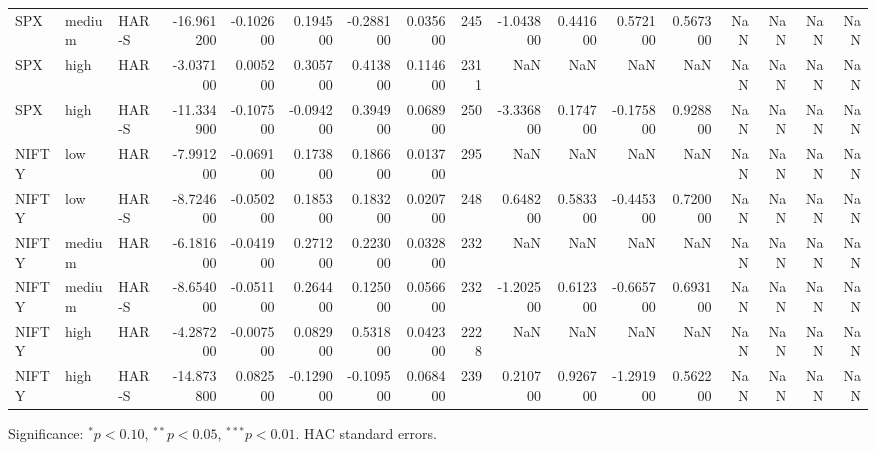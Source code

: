 \begin{table}[htbp]
{\begin{tabular}{lllrrrrrrrrrrrrrr}
SPX & medium & HAR-S & -16.961200 & -0.102600 & 0.194500 & -0.288100 & 0.035600 & 245 & -1.043800 & 0.441600 & 0.572100 & 0.567300 & NaN & NaN & NaN & NaN \\
SPX & high & HAR & -3.037100 & 0.005200 & 0.305700 & 0.413800 & 0.114600 & 2311 & NaN & NaN & NaN & NaN & NaN & NaN & NaN & NaN \\
SPX & high & HAR-S & -11.334900 & -0.107500 & -0.094200 & 0.394900 & 0.068900 & 250 & -3.336800 & 0.174700 & -0.175800 & 0.928800 & NaN & NaN & NaN & NaN \\
NIFTY & low & HAR & -7.991200 & -0.069100 & 0.173800 & 0.186600 & 0.013700 & 295 & NaN & NaN & NaN & NaN & NaN & NaN & NaN & NaN \\
NIFTY & low & HAR-S & -8.724600 & -0.050200 & 0.185300 & 0.183200 & 0.020700 & 248 & 0.648200 & 0.583300 & -0.445300 & 0.720000 & NaN & NaN & NaN & NaN \\
NIFTY & medium & HAR & -6.181600 & -0.041900 & 0.271200 & 0.223000 & 0.032800 & 232 & NaN & NaN & NaN & NaN & NaN & NaN & NaN & NaN \\
NIFTY & medium & HAR-S & -8.654000 & -0.051100 & 0.264400 & 0.125000 & 0.056600 & 232 & -1.202500 & 0.612300 & -0.665700 & 0.693100 & NaN & NaN & NaN & NaN \\
NIFTY & high & HAR & -4.287200 & -0.007500 & 0.082900 & 0.531800 & 0.042300 & 2228 & NaN & NaN & NaN & NaN & NaN & NaN & NaN & NaN \\
NIFTY & high & HAR-S & -14.873800 & 0.082500 & -0.129000 & -0.109500 & 0.068400 & 239 & 0.210700 & 0.926700 & -1.291900 & 0.562200 & NaN & NaN & NaN & NaN \\
\bottomrule
\end{tabular}
}
\begin{tablenotes}\footnotesize
  \item Significance: $^{*}p<0.10$, $^{**}p<0.05$, $^{***}p<0.01$. HAC standard errors.
\end{tablenotes}
\end{table}
